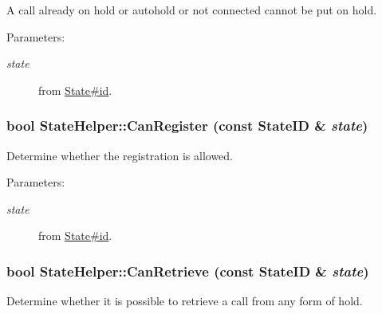 A call already on hold or autohold or not connected cannot be put on hold. \begin{Desc}
\item[Parameters:]
\begin{description}
\item[{\em state}]from \hyperlink{classState_f747db9527dfb6ea0a58fe7bfeb3ac80}{State\#id}. \end{description}
\end{Desc}
\hypertarget{classStateHelper_2b3caf1bdd542b47e46dfbfedccead7f}{
\subsubsection[{CanRegister}]{\setlength{\rightskip}{0pt plus 5cm}bool StateHelper::CanRegister (const {\bf StateID} \& {\em state})}}
\label{classStateHelper_2b3caf1bdd542b47e46dfbfedccead7f}


Determine whether the registration is allowed. 

\begin{Desc}
\item[Parameters:]
\begin{description}
\item[{\em state}]from \hyperlink{classState_f747db9527dfb6ea0a58fe7bfeb3ac80}{State\#id}. \end{description}
\end{Desc}
\hypertarget{classStateHelper_a563c5e68e7da3e9b763d402da50605c}{
\subsubsection[{CanRetrieve}]{\setlength{\rightskip}{0pt plus 5cm}bool StateHelper::CanRetrieve (const {\bf StateID} \& {\em state})}}
\label{classStateHelper_a563c5e68e7da3e9b763d402da50605c}


Determine whether it is possible to retrieve a call from any form of hold. 

